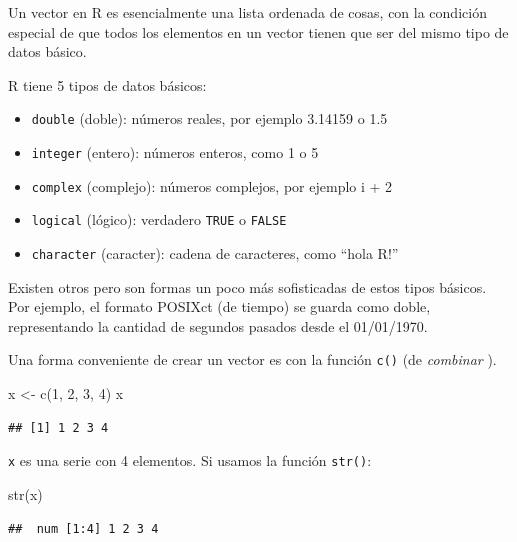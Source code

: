 \documentclass[
  openany]{book}
\newenvironment{Shaded}{\begin{snugshade}}{\end{snugshade}}
\newcommand{\DecValTok}[1]{\textcolor[rgb]{0.00,0.00,0.81}{#1}}
\newcommand{\FunctionTok}[1]{\textcolor[rgb]{0.00,0.00,0.00}{#1}}
\newcommand{\NormalTok}[1]{#1}
\newcommand{\OtherTok}[1]{\textcolor[rgb]{0.56,0.35,0.01}{#1}}
\providecommand{\tightlist}{%
  \setlength{\itemsep}{0pt}\setlength{\parskip}{0pt}}
\begin{document}
Un vector en R es esencialmente una lista ordenada de cosas, con la condición especial de que todos los elementos en un vector tienen que ser del mismo tipo de datos básico.

R tiene 5 tipos de datos básicos:

\begin{itemize}
\tightlist
\item
  \texttt{double} (doble): números reales, por ejemplo 3.14159 o 1.5
\item
  \texttt{integer} (entero): números enteros, como 1 o 5
\item
  \texttt{complex} (complejo): números complejos, por ejemplo i + 2
\item
  \texttt{logical} (lógico): verdadero \texttt{TRUE} o \texttt{FALSE}
\item
  \texttt{character} (caracter): cadena de caracteres, como ``hola R!''
\end{itemize}

Existen otros pero son formas un poco más sofisticadas de estos tipos básicos.
Por ejemplo, el formato POSIXct (de tiempo) se guarda como doble, representando la cantidad de segundos pasados desde el 01/01/1970.

Una forma conveniente de crear un vector es con la función \texttt{c()} (de \emph{combinar} ).

\begin{Shaded}
\begin{Highlighting}[]
\NormalTok{x }\OtherTok{\textless{}{-}} \FunctionTok{c}\NormalTok{(}\DecValTok{1}\NormalTok{, }\DecValTok{2}\NormalTok{, }\DecValTok{3}\NormalTok{, }\DecValTok{4}\NormalTok{)}
\NormalTok{x}
\end{Highlighting}
\end{Shaded}

\begin{verbatim}
## [1] 1 2 3 4
\end{verbatim}

\texttt{x} es una serie con 4 elementos.
Si usamos la función \texttt{str()}:

\begin{Shaded}
\begin{Highlighting}[]
\FunctionTok{str}\NormalTok{(x)}
\end{Highlighting}
\end{Shaded}

\begin{verbatim}
##  num [1:4] 1 2 3 4
\end{verbatim}
\end{document}
